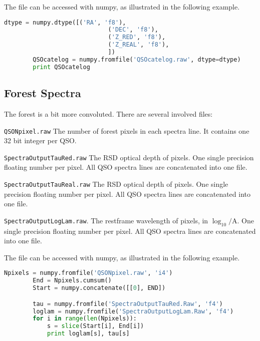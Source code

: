 \documentclass{paper}
\begin{document}
    The file can be accessed with numpy, as illustrated in the
    following example.
    \begin{lstlisting}[language=Python]
        dtype = numpy.dtype([('RA', 'f8'), 
                             ('DEC', 'f8'), 
                             ('Z_RED', 'f8'),
                             ('Z_REAL', 'f8'),
                             ])
        QSOcatelog = numpy.fromfile('QSOcatelog.raw', dtype=dtype)
        print QSOcatelog
    \end{lstlisting}

\subsection{Forest Spectra}
    The forest is a bit more convoluted. There are several
    involved files: \begin{description}
        \item {\tt QSONpixel.raw} The number of forest
            pixels in each spectra line. It contains one 32 bit
            integer per QSO.
        \item {\tt SpectraOutputTauRed.raw}
            The RSD optical depth of pixels. One single
            precision floating number per pixel. All QSO
            spectra lines are concatenated into one file.
        \item {\tt SpectraOutputTauReal.raw}
            The RSD optical depth of pixels. One single
            precision floating number per pixel. All QSO
            spectra lines are concatenated into one file.
        \item {\tt SpectraOutputLogLam.raw}.
            The restframe wavelength of pixels, in
            $\log_{10} /\mathrm{A}$.
            One single precision floating number per pixel.
            All QSO spectra lines are concatenated into one
            file.
    \end{description}
    The file can be accessed with numpy, as illustrated in the
    following example.
    \begin{lstlisting}[language=Python]
        Npixels = numpy.fromfile('QSONpixel.raw', 'i4')
        End = Npixels.cumsum()
        Start = numpy.concatenate([[0], END])

        tau = numpy.fromfile('SpectraOutputTauRed.Raw', 'f4')
        loglam = numpy.fromfile('SpectraOutputLogLam.Raw', 'f4')
        for i in range(len(Npixels)):
            s = slice(Start[i], End[i])
            print loglam[s], tau[s]
    \end{lstlisting}
\end{document}

